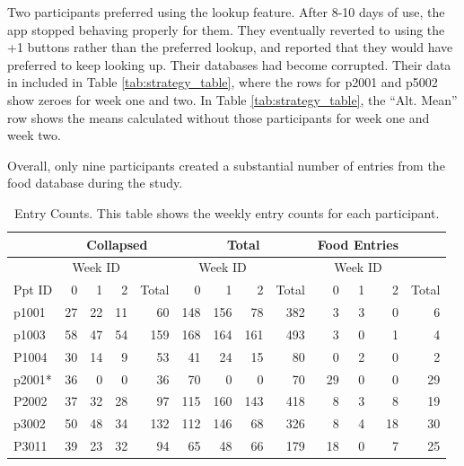 Two participants  preferred using the lookup feature. After 8-10 days of use, the app stopped behaving properly for them. They eventually reverted to using the +1 buttons rather than the preferred lookup, and reported that they would have preferred to keep looking up. Their databases had become corrupted. Their data in included in Table \ref{tab:strategy_table}, where the rows for p2001 and p5002 show zeroes for week one and two. In Table \ref{tab:strategy_table}, the ``Alt. Mean'' row shows the means calculated without those participants for week one and week two. 

Overall, only nine participants created a substantial number of entries from the food database during the study.  

\begin{table}[htbp]
\small
  \centering
  \caption[Entry Counts. ]{Entry Counts. This table shows the weekly entry counts for each participant. }
    \begin{tabular}{lrrrrrrrrrrrr}
    \toprule
          & \multicolumn{4}{c}{Collapsed} & \multicolumn{4}{c}{Total}     & \multicolumn{3}{c}{Food Entries} &  \\
    \midrule
          & \multicolumn{3}{c}{Week ID} & \multicolumn{1}{c}{} & \multicolumn{3}{c}{Week ID} & \multicolumn{1}{c}{} & \multicolumn{3}{c}{Week ID} &  \\
    Ppt ID & 0     & 1     & 2     & Total & 0     & 1     & 2     & Total & 0     & 1     & 2     & Total \\
    p1001 & 27    & 22    & 11    & 60    & 148   & 156   & 78    & 382   & 3     & 3     & 0     & 6 \\
    p1003 & 58    & 47    & 54    & 159   & 168   & 164   & 161   & 493   & 3     & 0     & 1     & 4 \\
    P1004 & 30    & 14    & 9     & 53    & 41    & 24    & 15    & 80    & 0     & 2     & 0     & 2 \\
    p2001* & 36    & 0     & 0     & 36    & 70    & 0     & 0     & 70    & 29    & 0     & 0     & 29 \\
    P2002 & 37    & 32    & 28    & 97    & 115   & 160   & 143   & 418   & 8     & 3     & 8     & 19 \\
    p3002 & 50    & 48    & 34    & 132   & 112   & 146   & 68    & 326   & 8     & 4     & 18    & 30 \\
    P3011 & 39    & 23    & 32    & 94    & 65    & 48    & 66    & 179   & 18    & 0     & 7     & 25 \\

\end{tabular}
\end{table}
